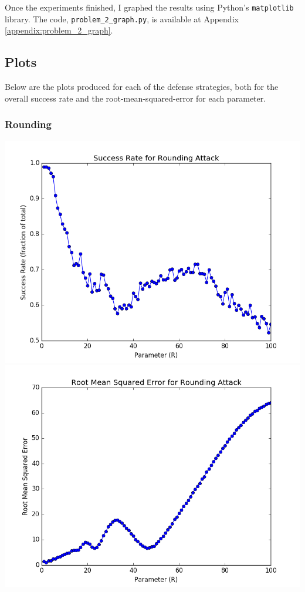\documentclass[12pt]{article}
\def\cl{\lstinline}
\begin{document}
\medskip

Once the experiments finished, I graphed the results using Python's \cl{matplotlib} library. The code, \cl{problem_2_graph.py}, is available at Appendix \ref{appendix:problem_2_graph}.

\subsection{Plots}

\noindent

Below are the plots produced for each of the defense strategies, both for the overall success rate and the root-mean-squared-error for each parameter.

\subsubsection{Rounding}
\includegraphics[scale=0.4]{figures/problem_2_rounding_success_rate.png} \includegraphics[scale=0.4]{figures/problem_2_rounding_error.png}
\end{document}
